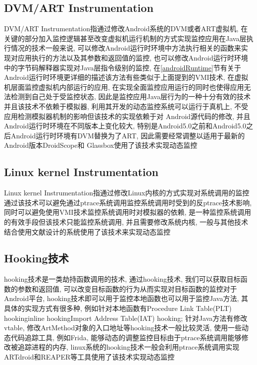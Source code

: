 \subsection{DVM/ART Instrumentation}
\label{artInstr}
DVM/ART Instrumentation指通过修改Android系统的DVM或者ART虚拟机,  在关键的部分加入监控逻辑甚至改变虚拟机运行机制的方式实现监控应用在Java层执行情况的技术\juhao 一般来说, 可以修改Android运行时环境中方法执行相关的函数来实现对应用执行的方法以及其参数和返回值的监控, 也可以修改Android运行时环境中的字节码解释器实现对Java层指令级别的监控, 在\ref{androidRuntime}节有关于Android运行时环境更详细的描述\juhao 该方法有些类似于上面提到的VMI技术, 在虚拟机层面监控虚拟机内部运行的应用, 在实现全面监控应用运行的同时也使得应用无法检测到自己处于受监控状态, 因此是监控应用Java层行为的一种十分有效的技术\juhao 并且该技术不依赖于模拟器, 利用其开发的动态监控系统可以运行于真机上, 不受应用检测模拟器机制的影响\juhao 但该技术的实现依赖于对
Android源代码的修改, 并且Android运行时环境在不同版本上变化较大, 特别是Android5.0之前和Android5.0之后Android运行时环境有DVM替换为了ART, 因此需要经常调整以适用于最新的Android版本\juhao DroidScope和 Glassbox使用了该技术实现动态监控\juhao

\subsection{Linux kernel Instrumentation}
Linux kernel Instrumentation指通过修改Linux内核的方式实现对系统调用的监控\juhao 通过该技术可以避免通过ptrace系统调用监控系统调用时受到的反ptrace技术影响, 同时可以避免使用VMI技术监控系统调用时对模拟器的依赖, 是一种监控系统调用的有效手段\juhao 但该技术只能监控系统调用, 并且需要修改系统内核, 一般与其他技术结合使用\juhao 文献\cite{chinese2}设计的系统使用了该技术来实现动态监控\juhao 

\subsection{Hooking技术}
hooking技术是一类劫持函数调用的技术, 通过hooking技术, 我们可以获取目标函数的参数和返回值, 可以改变目标函数的行为从而实现对目标函数的监控\juhao 对于Android平台, hooking技术即可以用于监控本地函数也可以用于监控Java方法, 其具体的实现方式有很多种, 例如针对本地函数有Procedure Link Table(PLT) hooking\dunhao inline hooking\dunhao Import Address Table(IAT) hooking; 针对Java方法有修改vtable, 修改ArtMethod对象的入口地址等\juhao hooking技术一般比较灵活, 使用一些动态代码追踪工具, 例如Frida, 能够动态的调整监控目标\juhao 由于ptrace系统调用能够修改被追踪进程的内存, linux系统的hooking技术一般会利用ptrace系统调用实现\juhao ARTdroid和REAPER等工具使用了该技术实现动态监控\juhao

